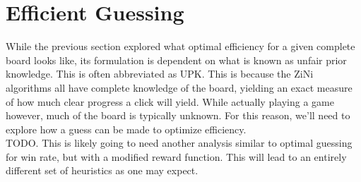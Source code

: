 \section{Efficient Guessing}

While the previous section explored what optimal efficiency for a given complete board looks like, its formulation is dependent on what is known as unfair prior knowledge. This is often abbreviated as UPK. This is because the ZiNi algorithms all have complete knowledge of the board, yielding an exact measure of how much clear progress a click will yield. While actually playing a game however, much of the board is typically unknown. For this reason, we'll need to explore how a guess can be made to optimize efficiency.\\


TODO. This is likely going to need another analysis similar to optimal guessing for win rate, but with a modified reward function. This will lead to an entirely different set of heuristics as one may expect.\\
